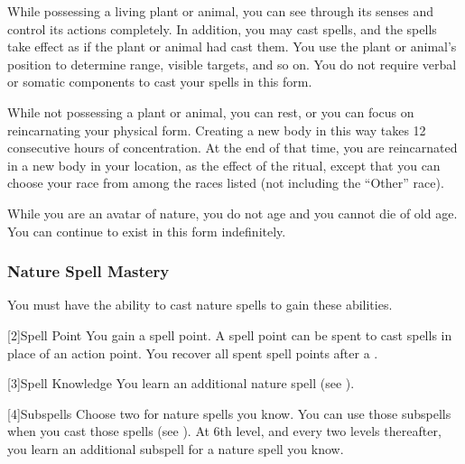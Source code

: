             While possessing a living plant or animal, you can see through its senses and control its actions completely.
            In addition, you may cast spells, and the spells take effect as if the plant or animal had cast them.
            You use the plant or animal's position to determine range, visible targets, and so on.
            You do not require verbal or somatic components to cast your spells in this form.

            While not possessing a plant or animal, you can rest, or you can focus on reincarnating your physical form.
            Creating a new body in this way takes 12 consecutive hours of concentration.
            At the end of that time, you are reincarnated in a new body in your location, as the effect of the  ritual, except that you can choose your race from among the races listed (not including the ``Other'' race).

            While you are an avatar of nature, you do not age and you cannot die of old age.
            You can continue to exist in this form indefinitely.

        \subsubsection{Nature Spell Mastery}
            You must have the ability to cast nature spells to gain these abilities.

            [2]{Spell Point}
            You gain a spell point.
            A spell point can be spent to cast spells in place of an action point.
            You recover all spent spell points after a .

            [3]{Spell Knowledge} 
            You learn an additional nature spell (see ).

            [4]{Subspells}
            Choose two  for nature spells you know.
            You can use those subspells when you cast those spells (see ).
            At 6th level, and every two levels thereafter, you learn an additional subspell for a nature spell you know.

